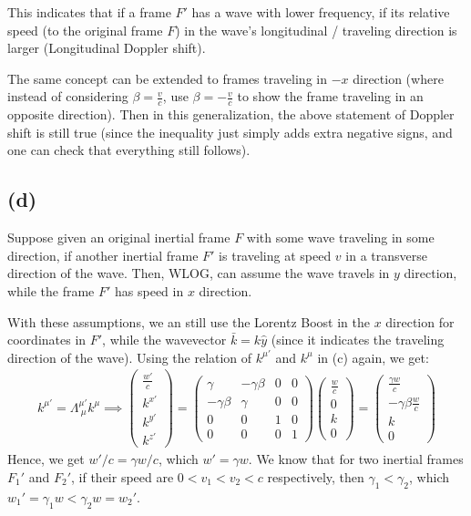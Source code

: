 \documentclass{article}
\begin{document}
This indicates that if a frame $F'$ has a wave with lower frequency, if its relative speed (to the original frame $F$) in the wave's longitudinal / traveling direction is larger (Longitudinal Doppler shift). 

The same concept can be extended to frames traveling in $-x$ direction (where instead of considering $\beta = \frac{v}{c}$, use $\beta = -\frac{v}{c}$ to show the frame traveling in an opposite direction). Then in this generalization, the above statement of Doppler shift is still true (since the inequality just simply adds extra negative signs, and one can check that everything still follows).

\subsection*{(d)}
Suppose given an original inertial frame $F$ with some wave traveling in some direction, if another inertial frame $F'$ is traveling at speed $v$ in a transverse direction of the wave. Then, WLOG, can assume the wave travels in $y$ direction, while the frame $F'$ has speed in $x$ direction.

With these assumptions, we an still use the Lorentz Boost in the $x$ direction for coordinates in $F'$, while the wavevector $\bar{k} = k\hat{y}$ (since it indicates the traveling direction of the wave). Using the relation of $k^{\mu'}$ and $k^\mu$ in (c) again, we get:
\begin{align}
    k^{\mu'} = \Lambda^{\mu'}_{\ \mu}k^\mu \implies \begin{pmatrix}
        \frac{w'}{c}\\k^{x'}\\k^{y'}\\k^{z'}
    \end{pmatrix}=\begin{pmatrix}
        \gamma & -\gamma\beta&0&0\\
        -\gamma\beta&\gamma&0&0\\
        0&0&1&0\\0&0&0&1
    \end{pmatrix}\begin{pmatrix}
        \frac{w}{c}\\0\\k\\0
    \end{pmatrix} = \begin{pmatrix}
        \frac{\gamma w}{c} \\-\gamma\beta \frac{w}{c}\\k\\0
    \end{pmatrix}
\end{align}
Hence, we get $w'/c = \gamma w/c$, which $w' = \gamma w$. We know that for two inertial frames $F_1'$ and $F_2'$, if their speed are $0<v_1<v_2<c$ respectively, then $\gamma_1 < \gamma_2$, which $w_1' = \gamma_1 w<\gamma_2 w=w_2'$. 
\end{document}

